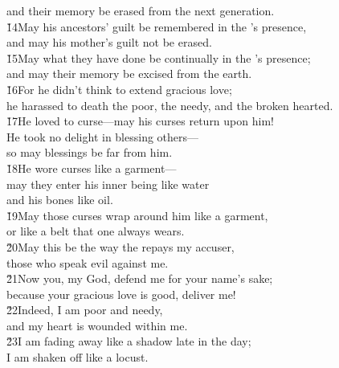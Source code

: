 \begin{poetry}
\poemll    and their memory be erased from the next generation. \\
\poeml \v{14}May his ancestors' guilt be remembered in the 's presence, \\
\poemll    and may his mother's guilt not be erased. \\
\poeml \v{15}May what they have done be continually in the 's presence; \\
\poemll    and may their memory be excised from the earth. \\
\poeml \v{16}For he didn't think to extend gracious love; \\
\poemll    he harassed to death the poor, the needy, and the broken hearted. \\
\poeml \v{17}He loved to curse---may his curses return upon him! \\
\poemll    He took no delight in blessing others--- \\
\poemlll       so may blessings be far from him. \\
\poeml \v{18}He wore curses like a garment--- \\
\poemll    may they enter his inner being like water \\
\poemlll       and his bones like oil. \\
\poeml \v{19}May those curses wrap around him like a garment, \\
\poemll    or like a belt that one always wears. \\
\poeml \v{20}May this be the way the  repays my accuser, \\
\poemll    those who speak evil against me. \\
\poeml \v{21}Now you,  my God, defend me for your name's sake; \\
\poemll    because your gracious love is good, deliver me! \\
\poeml \v{22}Indeed, I am poor and needy, \\
\poemll    and my heart is wounded within me. \\
\poeml \v{23}I am fading away like a shadow late in the day; \\
\poemll    I am shaken off like a locust. \\

\end{poetry}

